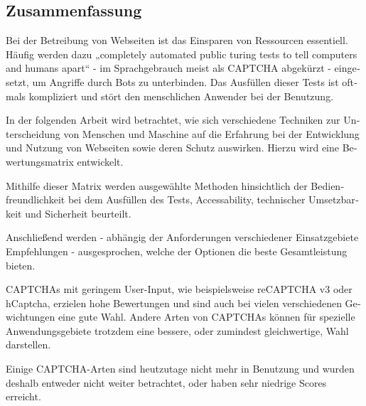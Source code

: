 \begin{otherlanguage}{ngerman}
	\chapter*{Zusammenfassung}
	Bei der Betreibung von Webseiten ist das Einsparen von Ressourcen essentiell. 
	Häufig werden dazu „completely automated public turing tests to tell computers and humans apart“ - im Sprachgebrauch meist als CAPTCHA abgekürzt - eingesetzt, um Angriffe durch Bots zu unterbinden. 
	Das Ausfüllen dieser Tests ist oftmals kompliziert und stört den menschlichen Anwender bei der Benutzung.

	In der folgenden Arbeit wird betrachtet, wie sich verschiedene Techniken zur Unterscheidung von Menschen und Maschine auf die Erfahrung bei der Entwicklung und Nutzung von Webseiten sowie deren Schutz auswirken. 
	Hierzu wird eine Bewertungsmatrix entwickelt. 

	Mithilfe dieser Matrix werden ausgewählte Methoden hinsichtlich der Bedienfreundlichkeit bei dem Ausfüllen des Tests, Accessability, technischer Umsetzbarkeit und Sicherheit beurteilt. 
	 
	Anschließend werden - abhängig der Anforderungen verschiedener Einsatzgebiete Empfehlungen - ausgesprochen, welche der Optionen die beste Gesamtleistung bieten.

	CAPTCHAs mit geringem User-Input, wie beispielsweise reCAPTCHA v3 oder hCaptcha, erzielen hohe Bewertungen und sind auch bei vielen verschiedenen Gewichtungen
	eine gute Wahl. 
	Andere Arten von CAPTCHAs können für spezielle Anwendungsgebiete trotzdem eine bessere, oder zumindest gleichwertige, Wahl darstellen.
	
	Einige CAPTCHA-Arten sind heutzutage nicht mehr in Benutzung und wurden deshalb entweder nicht weiter betrachtet,
	oder haben sehr niedrige Scores erreicht.

\end{otherlanguage}
